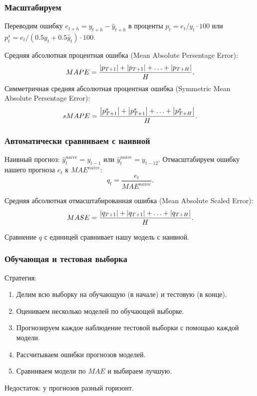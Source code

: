 \begin{frame}
    \frametitle{Масштабируем}

    Переводим ошибку $e_{t+h} = y_{t+h} - \hat y_{t+h}$  \alert{в проценты} $p_t= e_t/y_t \cdot 100$ или
    $p^s_t = e_t/(0.5 y_t + 0.5\hat y_t) \cdot 100$.

    \pause
    \alert{Средняя абсолютная процентная ошибка} (Mean Absolute Persentage Error):
    \[
    MAPE = \frac{\abs {p_{T+1}} + \abs{p_{T+1}}+ \ldots + \abs{p_{T+H}} }{H}.
    \]
    \pause 
    \alert{Симметричная средняя абсолютная процентная ошибка} (Symmetric Mean Absolute Persentage Error):
    \[
    sMAPE = \frac{\abs {p^s_{T+1}} + \abs{p^s_{T+1}}+ \ldots + \abs{p^s_{T+H}} }{H}.
    \]
    
\end{frame}

\begin{frame}
    \frametitle{Автоматически сравниваем с наивной}

    \alert{Наивный прогноз}: $\hat y^{naive}_t = y_{t-1}$ или $\hat y^{naive}_t = y_{t-12}$.
    \pause
    Отмасштабируем ошибку нашего прогноза $e_t$ к $MAE^{naive}$:
    \[
    q_t = \frac{e_t}{MAE^{naive}}.
    \]

    \pause
    \alert{Средняя абсолютная отмасштабированная ошибка} (Mean Absolute Scaled Error):
    \[
    MASE  = \frac{\abs {q_{T+1}} + \abs{q_{T+1}}+ \ldots + \abs{q_{T+H}} }{H}.
    \]

    \pause 
    Сравнение $q$ с единицей сравнивает нашу модель с наивной. 


\end{frame}


\begin{frame}
    \frametitle{Обучающая и тестовая выборка}

    Стратегия: 
    \begin{enumerate}[<+->]
        \item Делим всю выборку на \alert{обучающую} (в начале) и \alert{тестовую} (в конце).
        \item \alert{Оцениваем} несколько моделей по обучающей выборке.
        \item \alert{Прогнозируем} каждое наблюдение тестовой выборки с помощью каждой модели.
        \item Рассчитываем \alert{ошибки} прогнозов моделей.  
        \item \alert{Сравниваем} модели по $MAE$ и выбираем лучшую.
    \end{enumerate}

    \pause
    Недостаток: \alert{у прогнозов разный горизонт}.

\end{frame}


